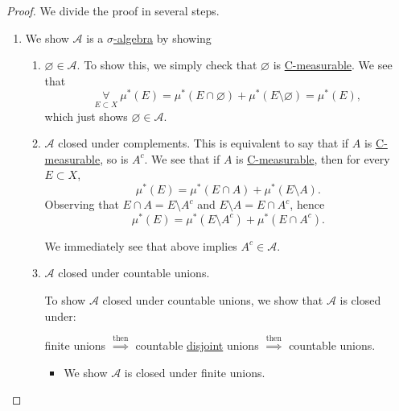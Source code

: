 \begin{proof}\let\qed\relax
	We divide the proof in several steps.
	\begin{enumerate}
		\item We show \(\mathcal{A}\) is a \hyperref[def:sigma-algebra]{\(\sigma\)-algebra} by showing
		      \begin{enumerate}
			      \item \(\varnothing \in \mathcal{A} \). To show this, we simply check that \(\varnothing \) is \hyperref[def:C-measurable]{C-measurable}. We see that
			            \[
				            \underset{E\subset X}{\forall}\ \mu^{*} (E) = \mu^{*} (E\cap \varnothing ) + \mu^{*} (E \setminus \varnothing ) = \mu^{*} (E),
			            \]
			            which just shows \(\varnothing \in \mathcal{A}\).
			      \item \(\mathcal{A} \) closed under complements. This is equivalent to say that if \(A\) is \hyperref[def:C-measurable]{C-measurable}, so is \(A^{c}\).
			            We see that if \(A\) is \hyperref[def:C-measurable]{C-measurable}, then for every \(E\subset X\),
			            \[
				            \mu^{*} (E) = \mu^{*} (E\cap A) + \mu^{*} (E\setminus A).
			            \]
			            Observing that \(E\cap A = E\setminus A^{c} \) and \(E\setminus A = E\cap A^{c} \), hence
			            \[
				            \mu^{*} (E) = \mu^{*} (E\setminus A^{c} ) + \mu^{*} (E\cap A^{c} ).
			            \]
			            \par We immediately see that above implies \(A^{c} \in\mathcal{A} \).
			      \item \(\mathcal{A} \) closed under countable unions.
			            \begin{note}
				            To show \(\mathcal{A} \) closed under countable unions, we show that \(\mathcal{A}\) is closed under:
				            \begin{center}
					            finite unions \(\overset{\text{then}}{\implies}\) countable \underline{disjoint} unions \(\overset{\text{then}}{\implies}\) countable unions.
				            \end{center}
			            \end{note}
			            \begin{itemize}
				            \item\label{pf:Caratheodory-extension-Thm-1-finite-unions} We show \(\mathcal{A} \) is closed under finite unions.


\end{itemize}
\end{enumerate}
\end{enumerate}
\end{proof}
